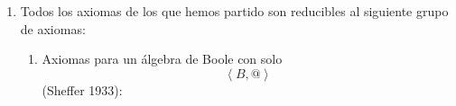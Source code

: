 \begin{enumerate}
\begin{enumerate}
\begin{enumerate}
\begin{enumerate}
        \[{= {{({{({{({x + y})} + z})} + \overline{x}})} \cdot {({{({{({{({x + y})} + z})} + \overline{y}})} \cdot 1})}}} =\]

        \[{= {{({{({{({x + y})} + z})} + \overline{x}})} \cdot {({{({{({x + y})} + z})} + \overline{y}})}}} =\]

        \[{= {{({{({x + y})} + z})} + {({\overline{x} \cdot \overline{y}})}}} =\]

        \[{= {{({{({x + y})} + z})} + \overline{({x+y})}}} =\]

        \[{= {\overline{({x+y})} + {({{({x + y})} + z})}}} =\]

        \[= 1\]
      \item
        \[\mathit{De}{\lbrack\mathbf{1}\rbrack}y\mathit{de}{\lbrack\mathbf{2}\rbrack}\mathit{obtenemos}\mathit{que}{\overline{a} = \overline{b}}\Rightarrow{a = b}\]
      \end{enumerate}
    \item
      Todos los axiomas de los que hemos partido son reducibles al
      siguiente grupo de axiomas:

      \begin{enumerate}
      \def\labelenumiv{\arabic{enumiv}.}
      \item
        Axiomas para un álgebra de Boole con
        solo\[\left\langle {B,@} \right\rangle\](Sheffer 1933):


\end{enumerate}
\end{enumerate}
\end{enumerate}
\end{enumerate}
